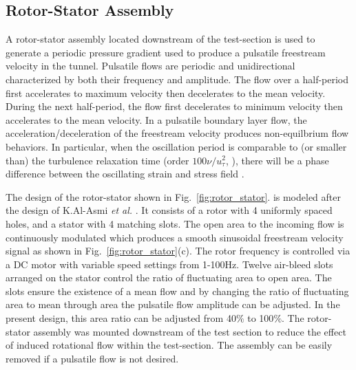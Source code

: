 \subsection{Rotor-Stator Assembly}
A rotor-stator assembly located downstream of the test-section is used to generate a periodic pressure gradient used to produce a pulsatile freestream velocity in the tunnel. Pulsatile flows are periodic and unidirectional characterized by both their frequency and amplitude. The flow over a half-period first accelerates to maximum velocity then decelerates to the mean velocity. During the next half-period, the flow first decelerates to minimum velocity then accelerates to the mean velocity.
In a pulsatile boundary layer flow, the acceleration/deceleration of the freestream velocity  produces non-equilbrium flow behaviors. In particular, when the oscillation period is comparable to (or smaller than) the turbulence relaxation time (order $100 \nu / u_\tau^2$, \cite{Peters1993}), there will be a phase difference between the oscillating strain and stress field \cite{Weng2016}. 

The design of the rotor-stator shown in Fig.~\ref{fig:rotor_stator}. is modeled after the design of K.Al-Asmi \textit{et al.} \cite{K.Al-Asmi1993}.
It consists of a rotor with 4 uniformly spaced holes, and a stator with 4 matching slots. The open area to the incoming flow is continuously modulated which produces a smooth sinusoidal freestream velocity signal as shown in Fig.~\ref{fig:rotor_stator}(c). The rotor frequency is controlled via a DC motor with variable speed settings from 1-100Hz. Twelve air-bleed slots arranged on the stator control the ratio of fluctuating area to open area. The slots ensure the existence of a mean flow and by changing the ratio of fluctuating area to mean through area the pulsatile flow amplitude can be adjusted. In the present design, this area ratio can be adjusted from 40$\%$ to 100$\%$. The rotor-stator assembly was mounted downstream of the test section to reduce the effect of induced rotational flow within the test-section. The assembly can be easily removed if a pulsatile flow is not desired. 

